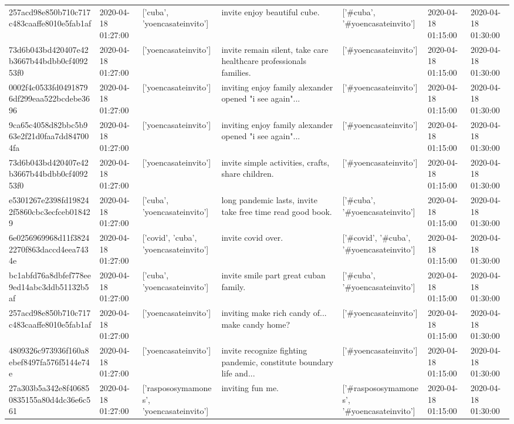 \begin{tabular}{lllllll}
257acd98e850b710c717c483caaffe8010e5fab1af & 2020-04-18 01:27:00 & ['cuba', 'yoencasateinvito'] & invite enjoy beautiful cube. & ['#cuba', '#yoencasateinvito'] & 2020-04-18 01:15:00 & 2020-04-18 01:30:00 \\
73d6b043bd420407e42b3667b44bdbb0cf409253f0 & 2020-04-18 01:27:00 & ['yoencasateinvito'] & invite remain silent, take care healthcare professionals families. & ['#yoencasateinvito'] & 2020-04-18 01:15:00 & 2020-04-18 01:30:00 \\
0002f4c0533fd04918796df299eaa522bcdebe3696 & 2020-04-18 01:27:00 & ['yoencasateinvito'] & inviting enjoy family alexander opened "i see again"... & ['#yoencasateinvito'] & 2020-04-18 01:15:00 & 2020-04-18 01:30:00 \\
9ca65c4058d82bbc5b963e2f21d0faa7dd847004fa & 2020-04-18 01:27:00 & ['yoencasateinvito'] & inviting enjoy family alexander opened "i see again"... & ['#yoencasateinvito'] & 2020-04-18 01:15:00 & 2020-04-18 01:30:00 \\
73d6b043bd420407e42b3667b44bdbb0cf409253f0 & 2020-04-18 01:27:00 & ['yoencasateinvito'] & invite simple activities, crafts, share children. & ['#yoencasateinvito'] & 2020-04-18 01:15:00 & 2020-04-18 01:30:00 \\
e5301267e2398fd198242f5860cbc3ecfceb018429 & 2020-04-18 01:27:00 & ['cuba', 'yoencasateinvito'] & long pandemic lasts, invite take free time read good book. & ['#cuba', '#yoencasateinvito'] & 2020-04-18 01:15:00 & 2020-04-18 01:30:00 \\
6e0256969968d11f38242270f863daccd4eea7434e & 2020-04-18 01:27:00 & ['covid', 'cuba', 'yoencasateinvito'] & invite covid over. & ['#covid', '#cuba', '#yoencasateinvito'] & 2020-04-18 01:15:00 & 2020-04-18 01:30:00 \\
bc1abfd76a8dbfef778ee9ed14abc3ddb51132b5af & 2020-04-18 01:27:00 & ['cuba', 'yoencasateinvito'] & invite smile part great cuban family. & ['#cuba', '#yoencasateinvito'] & 2020-04-18 01:15:00 & 2020-04-18 01:30:00 \\
257acd98e850b710c717c483caaffe8010e5fab1af & 2020-04-18 01:27:00 & ['yoencasateinvito'] & inviting make rich candy of... make candy home? & ['#yoencasateinvito'] & 2020-04-18 01:15:00 & 2020-04-18 01:30:00 \\
4809326c973936f160a8ebef8497fa576f5144e74e & 2020-04-18 01:27:00 & ['yoencasateinvito'] & invite recognize fighting pandemic, constitute boundary life and... & ['#yoencasateinvito'] & 2020-04-18 01:15:00 & 2020-04-18 01:30:00 \\
27a303b5a342e8f406850835155a80d4dc36e6c561 & 2020-04-18 01:27:00 & ['raspososymamones', 'yoencasateinvito'] & inviting fun me. & ['#raspososymamones', '#yoencasateinvito'] & 2020-04-18 01:15:00 & 2020-04-18 01:30:00 \\

\end{tabular}
